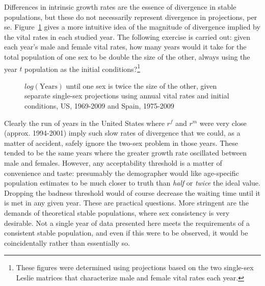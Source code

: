  \FloatBarrier
\label{sec:ageSRdoubling}
Differences in intrinsic growth rates are the essence of divergence in
stable populations, but these do not necessarily represent divergence in
projections, per se. Figure~\ref{fig:rSRdoubling} gives a more intuitive idea of
the magnitude of divergence implied by the vital rates in each studied year. The following
 exercise is carried out: given each year's male and
female vital rates, how many years would it take for the total population of one
sex to be double the size of the other, always using the year $t$ population as
the initial conditions?\footnote{These figures were determined using projections
based on the two single-sex Leslie matrices that characterize male and female
vital rates each year.}

\begin{figure}[ht!]
        \centering  
          \caption{$log(\mathrm{Years})$ until one sex is twice the size of the
          other, given separate single-sex projections using annual vital rates and initial
          conditions, US, 1969-2009 and Spain, 1975-2009}
           \quad
          \label{fig:rSRdoubling}
\end{figure}

Clearly the run of years in the United States where $r^f$ and $r^m$ were very
close (approx. 1994-2001) imply such slow rates of divergence that we could, as
a matter of accident, safely ignore the two-sex problem in those years. These
tended to be the same years where the greater growth rate oscillated between
male and females. However, any acceptability threshold is a matter of
convenience and taste: presumably the demographer would like age-specific 
population estimates to be much closer to truth than \textit{half} or \textit{twice} the ideal value.
Dropping the badness threshold would of course decrease the waiting time until
it is met in any given year. These are practical questions. More
stringent are the demands of theoretical stable populations, where
sex consistency is very desirable. Not a single year of data presented here
meets the requirements of a consistent stable population, and even if this were
to be observed, it would be coincidentally rather than essentially so. 
